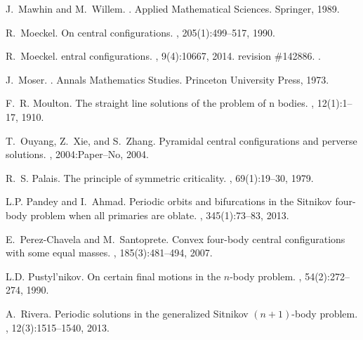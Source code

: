 \documentclass[smallcondensed]{svjour3}
\begin{document}
\begin{thebibliography}{10}
J.~Mawhin and M.~Willem.
.
\newblock Applied Mathematical Sciences. Springer, 1989.

R.~Moeckel.
\newblock On central configurations.
, 205(1):499--517, 1990.

R.~Moeckel.
entral configurations.
, 9(4):10667, 2014.
\newblock revision \#142886.
\newblock \href {http://dx.doi.org/10.4249/scholarpedia.10667}
  {}.

J.~Moser.
.
\newblock Annals Mathematics Studies. Princeton University Press, 1973.

F.~R. Moulton.
\newblock The straight line solutions of the problem of n bodies.
, 12(1):1--17, 1910.

T.~Ouyang, Z.~Xie, and S.~Zhang.
\newblock Pyramidal central configurations and perverse solutions.
, 2004:Paper--No, 2004.

R.~S. Palais.
\newblock The principle of symmetric criticality.
, 69(1):19--30, 1979.

L.P. Pandey and I.~Ahmad.
\newblock Periodic orbits and bifurcations in the {S}itnikov four-body problem
  when all primaries are oblate.
, 345(1):73--83, 2013.

E.~Perez-Chavela and M.~Santoprete.
\newblock Convex four-body central configurations with some equal masses.
, 185(3):481--494,
  2007.

L.D. Pustyl'nikov.
\newblock On certain final motions in the $n$-body problem.
, 54(2):272--274,
  1990.

A.~Rivera.
\newblock Periodic solutions in the generalized {S}itnikov $(n+1)$-body
  problem.
, 12(3):1515--1540,
  2013.


\end{thebibliography}
\end{document}
